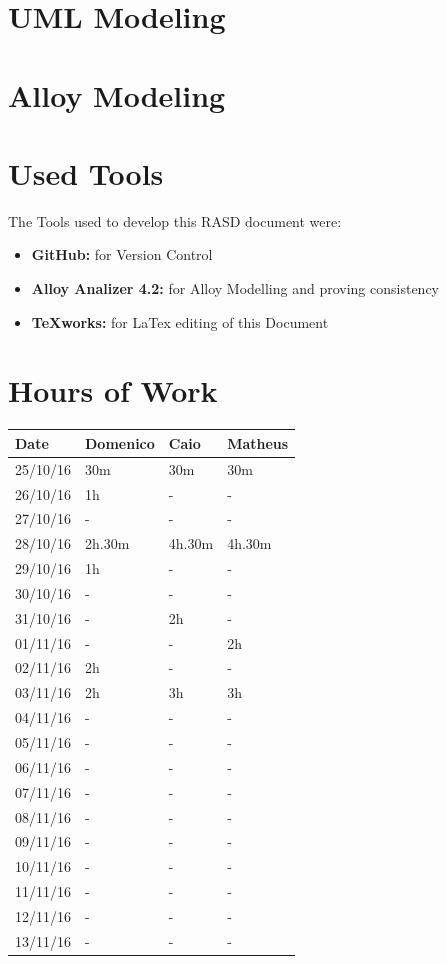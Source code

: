 \documentclass[a4paper]{article}
\begin{document}
\section{UML Modeling}

\section{Alloy Modeling}
\newpage

\section{Used Tools}
The Tools used to develop this RASD document were:
\begin{itemize}
	\item \textbf{GitHub:} for Version Control
	\item \textbf{Alloy Analizer 4.2:} for Alloy Modelling and proving consistency 
	\item \textbf {TeXworks:} for LaTex editing of this Document
\end{itemize}
\newpage

\section{Hours of Work}
\begin{tabular}{ | l | l | l | l | }
\hline
	\textbf {Date} & \textbf {Domenico} & \textbf {Caio} & \textbf {Matheus} \\ \hline
	25/10/16& 30m & 30m & 30m \\ \hline
	26/10/16& 1h & -  & -  \\ \hline
	27/10/16&  - & - & -  \\ \hline
	28/10/16& 2h.30m & 4h.30m & 4h.30m \\ \hline
	29/10/16& 1h & -  & - \\ \hline
	30/10/16&  - & - & - \\ \hline
	31/10/16&  - & 2h & - \\ \hline
	01/11/16&  - & - & 2h \\ \hline
	02/11/16&  2h & - & - \\ \hline
	03/11/16&  2h & 3h & 3h \\ \hline
	04/11/16&  - & - & - \\ \hline
	05/11/16&  - & - & - \\ \hline
	06/11/16&  - & - & - \\ \hline
	07/11/16&  - & - & - \\ \hline
	08/11/16&  - & - & - \\ \hline
	09/11/16&  - & - & - \\ \hline
	10/11/16&  - & - & - \\ \hline
	11/11/16&  - & - & - \\ \hline
	12/11/16&  - & - & - \\ \hline
	13/11/16&  - & - & - \\ \hline
\end{tabular}

\newpage
\end{document}
